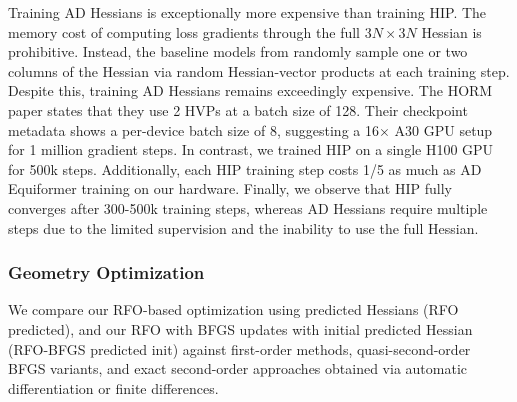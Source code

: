 \documentclass[pdflatex,sn-mathphys-num]{sn-jnl}%
\theoremstyle{thmstyleone}%
\theoremstyle{thmstyletwo}%
\theoremstyle{thmstylethree}%
\begin{document}
\begin{appendices}
Training AD Hessians is exceptionally more expensive than training HIP.
The memory cost of computing loss gradients through the full  $3N\times3N$ Hessian is prohibitive. Instead, the baseline models from \cite{cui2025horm} randomly sample one or two columns of the Hessian via random Hessian-vector products at each training step. Despite this, training AD Hessians remains exceedingly expensive. The HORM paper states that they use 2 HVPs at a batch size of 128. Their checkpoint metadata shows a per-device batch size of 8, suggesting a 16$\times$ A30 GPU setup for 1 million gradient steps.
In contrast, we trained HIP on a single H100 GPU for 500k steps. Additionally, each HIP training step costs 1/5 as much as AD Equiformer training on our hardware. Finally, we observe that HIP fully converges after 300-500k training steps, whereas AD Hessians require multiple steps due to the limited supervision and the inability to use the full Hessian.

\begin{table}[h]
\centering
\renewcommand{\arraystretch}{1.6} %
\caption{\textbf{Summary of training resources.} Comparing HIP to checkpoints from HORM \citep{cui2025horm}.}
\label{tab:traingpu}
\end{table}

\subsubsection{Geometry Optimization \label{sec:relax_methods}}
We compare our RFO-based optimization \citep{RSRFO1998a} using predicted Hessians (RFO predicted), and our RFO with BFGS updates with initial predicted Hessian (RFO-BFGS predicted init) against first-order methods, quasi-second-order BFGS variants, and exact second-order approaches obtained via automatic differentiation or finite differences. 


\end{appendices}
\end{document}

